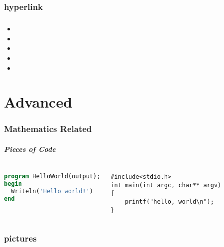\documentclass[11pt]{beamer}
\begin{document}
\section{hyperlink}
\begin{frame}
\frametitle{\secname}

\begin{itemize}
\item{}
\item{}
\item{}
\item{}
\item {}
\end{itemize}

\end{frame}

\part{Advanced}
\frame{\partpage}

\section{Mathematics Related}

\begin{frame}[containsverbatim]
\frametitle{Pieces of Code}
\centering{}
\vskip18pt
\begin{columns}
{{\tiny{
\begin{lstlisting}[language={PASCAL},caption= PASCAL code]
program HelloWorld(output);
begin
  Writeln('Hello world!')
end
\end{lstlisting}
}}
}
{\tiny{
\begin{lstlisting}[language={[ANSI]C},caption= C code]
#include<stdio.h>
int main(int argc, char** argv)
{
	printf("hello, world\n");
}
\end{lstlisting}
}}
\end{columns}
\end{frame}

\section{pictures}


% 
\end{document}
